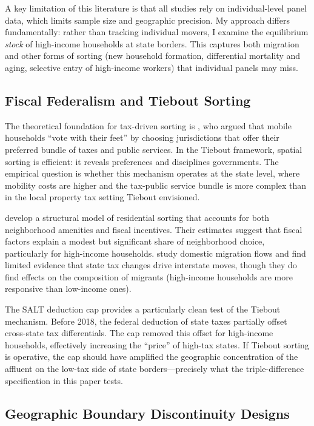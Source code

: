 \documentclass[12pt]{article}
\begin{document}
A key limitation of this literature is that all studies rely on individual-level panel data, which limits sample size and geographic precision. My approach differs fundamentally: rather than tracking individual movers, I examine the equilibrium \textit{stock} of high-income households at state borders. This captures both migration and other forms of sorting (new household formation, differential mortality and aging, selective entry of high-income workers) that individual panels may miss.

\subsection{Fiscal Federalism and Tiebout Sorting}

The theoretical foundation for tax-driven sorting is \citet{tiebout1956pure}, who argued that mobile households ``vote with their feet'' by choosing jurisdictions that offer their preferred bundle of taxes and public services. In the Tiebout framework, spatial sorting is efficient: it reveals preferences and disciplines governments. The empirical question is whether this mechanism operates at the state level, where mobility costs are higher and the tax-public service bundle is more complex than in the local property tax setting Tiebout envisioned.

\citet{bayer2007general} develop a structural model of residential sorting that accounts for both neighborhood amenities and fiscal incentives. Their estimates suggest that fiscal factors explain a modest but significant share of neighborhood choice, particularly for high-income households. \citet{cohen2011interstate} study domestic migration flows and find limited evidence that state tax changes drive interstate moves, though they do find effects on the composition of migrants (high-income households are more responsive than low-income ones).

The SALT deduction cap provides a particularly clean test of the Tiebout mechanism. Before 2018, the federal deduction of state taxes partially offset cross-state tax differentials. The cap removed this offset for high-income households, effectively increasing the ``price'' of high-tax states. If Tiebout sorting is operative, the cap should have amplified the geographic concentration of the affluent on the low-tax side of state borders---precisely what the triple-difference specification in this paper tests.

\subsection{Geographic Boundary Discontinuity Designs}
\end{document}
